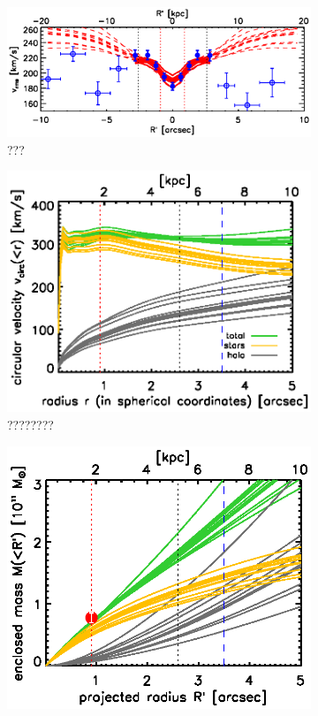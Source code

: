 \begin{figure}
\centering
\begin{subfigure}{\textwidth}
  \centering
  \includegraphics[width=0.8\linewidth]{fig/B4_rms_error_curves.ps}
  \caption{???}
  \label{fig:???}
\end{subfigure}
\begin{subfigure}{.5\textwidth}
  \centering
  \includegraphics[width=0.9\linewidth]{fig/B4_jam_profiles_errors_short_vcirc.ps}
  \caption{????????}
  \label{fig:???}
\end{subfigure}%
\begin{subfigure}{.5\textwidth}
  \centering
  \includegraphics[width=0.9\linewidth]{fig/B4_jam_profiles_errors_short_projmass.ps}

\end{subfigure}
\end{figure}

